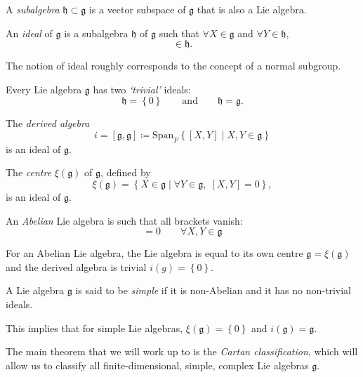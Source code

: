 \begin{definition}[subalgebra]
  A \emph{subalgebra} $\mathfrak{h} \subset \mathfrak{g}$ is a vector subspace of $\mathfrak{g}$ that is also a Lie algebra.
\end{definition}

\begin{definition}[ideal]
  An \emph{ideal} of $\mathfrak{g}$ is a subalgebra $\mathfrak{h}$ of $\mathfrak{g}$ such that $\forall X \in \mathfrak{g}$ and $\forall Y \in \mathfrak{h}$,
  \begin{equation}
    [X, Y] \in \mathfrak{h}.
  \end{equation}
\end{definition}
The notion of ideal roughly corresponds to the concept of a normal subgroup.

\begin{example}
  Every Lie algebra $\mathfrak{g}$ has two \emph{`trivial'} ideals:
  \begin{equation}
    \mathfrak{h} = \left\{ 0 \right\} \qquad \text{and} \qquad \mathfrak{h} = \mathfrak{g}.
  \end{equation}
\end{example}
\begin{example}
  The \emph{derived algebra} 
  \begin{equation} 
    i = [\mathfrak{g}, \mathfrak{g}] \coloneq \text{Span}_F \left\{ [X, Y] \mid X, Y \in \mathfrak{g} \right\} 
  \end{equation} 
  is an ideal of $\mathfrak{g}$.
\end{example}
\begin{example}
  The \emph{centre} $\xi(\mathfrak{g})$ of $\mathfrak{g}$, defined by
  \begin{equation}
    \xi(\mathfrak{g}) = \left\{ X \in \mathfrak{g} \mid \forall Y \in \mathfrak{g},\; [X, Y] = 0 \right\},
  \end{equation}
  is an ideal of $\mathfrak{g}$.
\end{example}

\begin{definition}
  An \emph{Abelian} Lie algebra is such that all brackets vanish:
  \begin{equation}
    [X, Y] = 0 \qquad \forall X, Y \in \mathfrak{g}
  \end{equation}
\end{definition}

For an Abelian Lie algebra, the Lie algebra is equal to its own centre $\mathfrak{g} = \xi(\mathfrak{g})$ and the derived algebra is trivial $i(g) = \left\{ 0 \right\}$.

\begin{definition}[simple]
  A Lie algebra $\mathfrak{g}$ is said to be \emph{simple} if it is non-Abelian and it has no non-trivial ideals.
\end{definition}
This implies that for simple Lie algebras, $\xi(\mathfrak{g}) = \left\{ 0 \right\}$ and $i(\mathfrak{g}) = \mathfrak{g}$.

The main theorem that we will work up to is the \emph{Cartan classification}, which will allow us to classify all finite-dimensional, simple, complex Lie algebras $\mathfrak{g}$.
